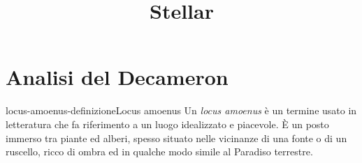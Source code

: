 \documentclass[preview]{standalone}
\begin{document}
\title{Stellar}
\genpage

\section{Analisi del Decameron}


\begin{snippetdefinition}{locus-amoenus-definizione}{Locus amoenus}
    Un \textit{locus amoenus} è un termine usato in letteratura
    che fa riferimento a un luogo idealizzato e piacevole.
    È un posto immerso tra piante ed alberi,
    spesso situato nelle vicinanze di una fonte o di un ruscello,
    ricco di ombra ed in qualche modo simile al Paradiso terrestre. 
\end{snippetdefinition}
\end{document}
